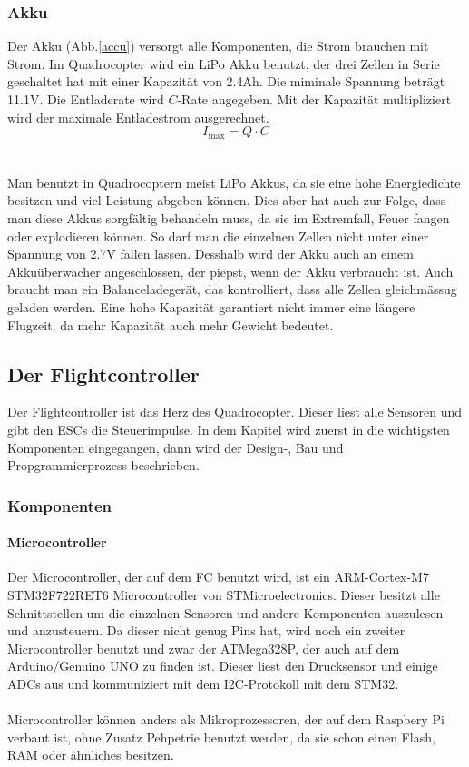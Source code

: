 \documentclass[12pt,a4paper, ngerman]{article}
\begin{document}
\subsubsection{Akku}
Der Akku (Abb.\ref{accu}) versorgt alle Komponenten, die Strom brauchen mit Strom. Im Quadrocopter wird ein LiPo Akku benutzt, der drei Zellen in Serie geschaltet hat mit einer Kapazität von 2.4Ah. Die miminale Spannung beträgt 11.1V. Die Entladerate wird $C$-Rate angegeben. Mit der Kapazität multipliziert wird der maximale Entladestrom ausgerechnet.\cite{website:fpvracing.ch_Mult_Komp}
\begin{equation}
I_{\text{max}}=Q\cdot C
\end{equation}\\ \\
Man benutzt in Quadrocoptern meist LiPo Akkus, da sie eine hohe Energiedichte besitzen und viel Leistung abgeben können. Dies aber hat auch zur Folge, dass man diese Akkus sorgfältig behandeln muss, da sie im Extremfall, Feuer fangen oder explodieren können. So darf man die einzelnen Zellen nicht unter einer Spannung von 2.7V fallen lassen. Desshalb wird der Akku auch an einem Akkuüberwacher angeschlossen, der piepst, wenn der Akku verbraucht ist. Auch braucht man ein Balanceladegerät, das kontrolliert, dass alle Zellen gleichmässug geladen werden. Eine hohe Kapazität garantiert nicht immer eine längere Flugzeit, da mehr Kapazität auch mehr Gewicht bedeutet.\cite{website:fpvracing.ch_Mult_Komp}
\newpage

\subsection{Der Flightcontroller}
Der Flightcontroller ist das Herz des Quadrocopter. Dieser liest alle Sensoren und gibt den ESCs die Steuerimpulse. In dem Kapitel wird zuerst in die wichtigsten Komponenten eingegangen, dann wird der Design-, Bau und Propgrammierprozess beschrieben.
\subsubsection{Komponenten}
\paragraph{Microcontroller}
Der Microcontroller, der auf dem FC benutzt wird, ist ein ARM-Cortex-M7 STM32F722RET6 Microcontroller von STMicroelectronics. Dieser besitzt alle Schnittstellen um die einzelnen Sensoren und andere Komponenten auszulesen und anzusteuern. Da dieser nicht genug Pins hat, wird noch ein zweiter Microcontroller benutzt und zwar der ATMega328P, der auch auf dem Arduino/Genuino UNO zu finden ist. Dieser liest den Drucksensor und einige ADCs aus und kommuniziert mit dem I2C-Protokoll mit dem STM32. \\ \\
Microcontroller können anders als Mikroprozessoren, der auf dem Raspbery Pi verbaut ist, ohne Zusatz Pehpetrie benutzt werden, da sie schon einen Flash, RAM oder ähnliches besitzen. 
\end{document}
